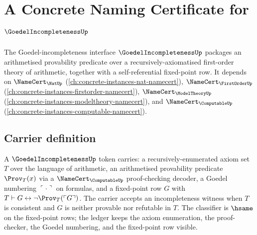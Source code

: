 \chapter{A Concrete Naming Certificate for $\GoedelIncompletenessUp$}
\label{ch:concrete-instances-goedelincompleteness-namecert}

The Goedel-incompleteness interface $\GoedelIncompletenessUp$ packages an arithmetised provability predicate over a recursively-axiomatised first-order theory of arithmetic, together with a self-referential fixed-point row. It depends on $\NameCert_{\NatUp}$ (\autoref{ch:concrete-instances-nat-namecert}), $\NameCert_{\FirstOrderUp}$ (\autoref{ch:concrete-instances-firstorder-namecert}), $\NameCert_{\ModelTheoryUp}$ (\autoref{ch:concrete-instances-modeltheory-namecert}), and $\NameCert_{\ComputableUp}$ (\autoref{ch:concrete-instances-computable-namecert}).

\section{Carrier definition}
\label{sec:goedelincompleteness-carrier}

A $\GoedelIncompletenessUp$ token carries: a recursively-enumerated axiom set $T$ over the language of arithmetic, an arithmetised provability predicate $\Prov_T(x)$ via a $\NameCert_{\ComputableUp}$ proof-checking decoder, a Goedel numbering $\ulcorner\cdot\urcorner$ on formulas, and a fixed-point row $G$ with $T\vdash G\leftrightarrow\neg\Prov_T(\ulcorner G\urcorner)$. The carrier accepts an incompleteness witness when $T$ is consistent and $G$ is neither provable nor refutable in $T$. The classifier is $\hsame$ on the fixed-point rows; the ledger keeps the axiom enumeration, the proof-checker, the Goedel numbering, and the fixed-point row visible.

